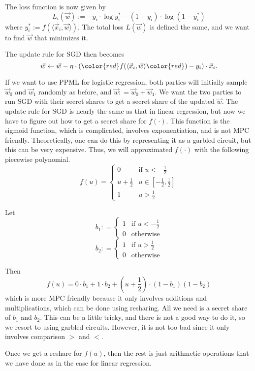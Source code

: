 The loss function is now given by
$$L_i(\vec{w}):= -y_i \cdot \log y_i^* - (1-y_i) \cdot \log(1-y_i^*)$$
where $y_i^* := f(\langle \vec{x}_i, \vec{w}\rangle)$. The total loss $L(\vec{w})$ is defined the same, and we want to find $\vec{w}$ that minimizes it.

The update rule for SGD then becomes
$$\vec{w} \gets \vec{w} - \eta \cdot ({\color{red} f(}\langle \vec{x}_i, \vec{w}\rangle{\color{red} )} - y_i)\cdot \vec{x}_i.$$

If we want to use PPML for logistic regression, both parties will initially sample $\vec{w}_0$ and $\vec{w}_1$ randomly as before, and $\vec{w}: = \vec{w}_0 + \vec{w}_1$. We want the two parties to run SGD with their secret shares to get a secret share of the updated $\vec{w}$. The update rule for SGD is nearly the same as that in linear regression, but now we have to figure out how to get a secret share for $f(\cdot)$. This function is the sigmoid function, which is complicated, involves exponentiation, and is not MPC friendly. Theoretically, one can do this by representing it as a garbled circuit, but this can be very expensive. Thus, we will approximated $f(\cdot)$ with the following piecewise polynomial.
$$f(u) = \begin{cases}
    0 & \text{if }u < -\frac{1}{2}\\
    u + \frac{1}{2} & u \in [-\frac{1}{2}, \frac{1}{2}]\\
    1 & u > \frac{1}{2}
\end{cases}$$

Let
$$b_1 : = \begin{cases}
    1 & \text{if }u < -\frac{1}{2}\\
    0 & \text{otherwise}
\end{cases}$$
$$b_2 : = \begin{cases}
    1 & \text{if }u > \frac{1}{2}\\
    0 & \text{otherwise}
\end{cases}$$

Then $$f(u) = 0 \cdot b_1 + 1 \cdot b_2 + (u + \frac{1}{2})\cdot (1-b_1)(1-b_2)$$
which is more MPC friendly because it only involves additions and multiplications, which can be done using resharing. All we need is a secret share of $b_1$ and $b_2$. This can be a little tricky, and there is not a good way to do it, so we resort to using garbled circuits. However, it is not too bad since it only involves comparison $>$ and $<$.

Once we get a reshare for $f(u)$, then the rest is just arithmetic operations that we have done as in the case for linear regression.

